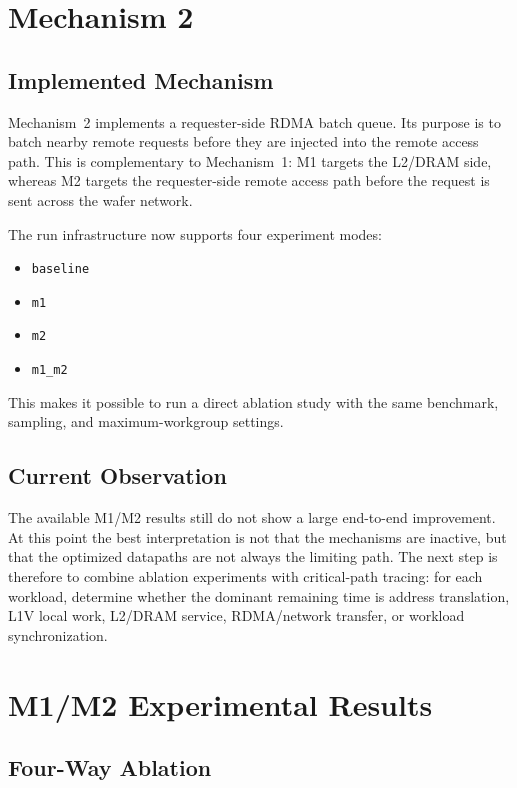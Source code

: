 \documentclass[sigconf,screen,review]{acmart}
\begin{document}
\section{Mechanism 2}

\subsection{Implemented Mechanism}

Mechanism~2 implements a requester-side RDMA batch queue.  Its purpose is to
batch nearby remote requests before they are injected into the remote access
path.  This is complementary to Mechanism~1: M1 targets the L2/DRAM side,
whereas M2 targets the requester-side remote access path before the request is
sent across the wafer network.

The run infrastructure now supports four experiment modes:
\begin{itemize}
  \item \texttt{baseline}
  \item \texttt{m1}
  \item \texttt{m2}
  \item \texttt{m1\_m2}
\end{itemize}

This makes it possible to run a direct ablation study with the same benchmark,
sampling, and maximum-workgroup settings.

\subsection{Current Observation}

The available M1/M2 results still do not show a large end-to-end improvement.
At this point the best interpretation is not that the mechanisms are inactive,
but that the optimized datapaths are not always the limiting path.  The next
step is therefore to combine ablation experiments with critical-path tracing:
for each workload, determine whether the dominant remaining time is address
translation, L1V local work, L2/DRAM service, RDMA/network transfer, or
workload synchronization.

\section{M1/M2 Experimental Results}

\subsection{Four-Way Ablation}
\end{document}
